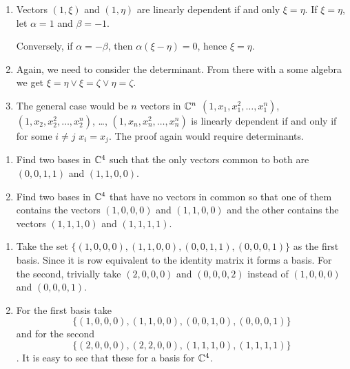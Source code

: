 \begin{solution}
  \begin{enumerate}[label=(\alph*)]
    \item Vectors $(1, \xi)$ and $(1, \eta)$ are linearly dependent if and only $\xi = \eta$.
      If $\xi = \eta$, let $\alpha = 1$ and $\beta = -1$.
      
      Conversely, if $\alpha = -\beta$, then $\alpha(\xi - \eta) = 0$, hence $\xi = \eta$.
    \item Again, we need to consider the determinant.
      From there with a some algebra we get $\xi = \eta \vee \xi = \zeta \vee \eta = \zeta$.
    \item The general case would be $n$ vectors in $\mathbb{C}^n$ $(1, x_1, x_1^2, \ldots, x_1^n)$, $(1, x_2, x_2^2, \ldots, x_2^n)$, \ldots, $(1, x_n, x_n^2, \ldots, x_n^n)$ is linearly dependent if and only if for some $i \neq j$ $x_i = x_j$.
      The proof again would require determinants.
  \end{enumerate}
\end{solution}

\begin{problem}
  \begin{enumerate}[label=(\alph*)]
    \item Find two bases in $\mathbb{C}^4$ such that the only vectors common to both are $(0, 0, 1, 1)$ and $(1, 1, 0, 0)$.
    \item Find two bases in $\mathbb{C}^4$ that have no vectors in common so that one of them contains the vectors $(1, 0, 0, 0)$ and $(1, 1, 0, 0)$ and the other contains the vectors $(1, 1, 1, 0)$ and $(1, 1, 1, 1)$.
  \end{enumerate}
\end{problem}

\begin{solution}
  \begin{enumerate}[label=(\alph*)]
    \item Take the set $\{(1, 0, 0, 0), (1, 1, 0, 0), (0, 0, 1, 1), (0, 0, 0, 1)\}$ as the first basis.
      Since it is row equivalent to the identity matrix it forms a basis.
      For the second, trivially take $(2, 0, 0, 0)$ and $(0, 0, 0, 2)$ instead of $(1, 0, 0, 0)$ and $(0, 0, 0, 1)$.
    \item For the first basis take \[\{(1, 0, 0, 0), (1, 1, 0, 0), (0, 0, 1, 0), (0, 0, 0, 1)\}\] and for the second \[\{(2, 0, 0, 0), (2, 2, 0, 0), (1, 1, 1, 0), (1, 1, 1, 1)\}\].
      It is easy to see that these for a basis for $\mathbb{C}^4$.
  \end{enumerate}
\end{solution}

